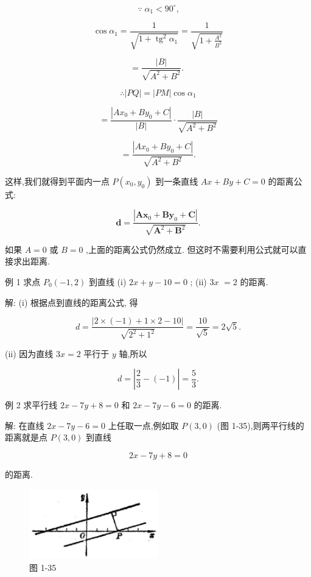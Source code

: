 \documentclass[lang=cn,newtx,10pt,scheme=chinese]{elegantbook}
\begin{document}
\[
  \because \;{\alpha }_{1} < {90}^{ \circ }\text{,}
\]

\[
  \cos {\alpha }_{1} = \frac{1}{\sqrt{1 + {\operatorname{tg}}^{2}{\alpha }_{1}}} = \frac{1}{\sqrt{1 + \frac{{A}^{2}}{{B}^{2}}}}
\]

\[
  = \frac{\left| B\right| }{\sqrt{{A}^{2} + {B}^{2}}}\text{. }
\]

\[
  \therefore \left| {PQ}\right| = \left| {PM}\right| \cos {\alpha }_{1}
\]

\[
  = \frac{\left| A{x}_{0} + B{y}_{0} + C\right| }{\left| B\right| } \cdot \frac{\left| B\right| }{\sqrt{{A}^{2} + {B}^{2}}}
\]

\[
  = \frac{\left| A{x}_{0} + B{y}_{0} + C\right| }{\sqrt{{A}^{2} + {B}^{2}}}.
\]

这样,我们就得到平面内一点 \(P\left( {{x}_{0},{y}_{0}}\right)\) 到一条直线 \({Ax} + {By} + C = 0\) 的距离公式:

\[
  \mathbf{d} = \frac{\left| \mathbf{A}{\mathbf{x}}_{0} + \mathbf{B}{\mathbf{y}}_{0} + \mathbf{C}\right| }{\sqrt{{\mathbf{A}}^{2} + {\mathbf{B}}^{2}}}.
\]

如果 \(A = 0\) 或 \(B = 0\) ,上面的距离公式仍然成立. 但这时不需要利用公式就可以直接求出距离.

例 1 求点 \({P}_{0}\left( {-1,2}\right)\) 到直线 (i) \({2x} + y - {10} = 0\) ; (ii) \({3x}\) \(= 2\) 的距离.

解: (i) 根据点到直线的距离公式, 得

\[
  d = \frac{\left| 2 \times \left( -1\right) + 1 \times 2 - {10}\right| }{\sqrt{{2}^{2} + {1}^{2}}} = \frac{10}{\sqrt{5}} = 2\sqrt{5}.
\]

(ii) 因为直线 \({3x} = 2\) 平行于 \(y\) 轴,所以

\[
  d = \left| {\frac{2}{3} - \left( {-1}\right) }\right| = \frac{5}{3}.
\]

例 2 求平行线 \({2x} - {7y} + 8 = 0\) 和 \({2x} - {7y} - 6 = 0\) 的距离.

解: 在直线 \({2x} - {7y} - 6 = 0\) 上任取一点,例如取 \(P\left( {3,0}\right)\) (图 1-35),则两平行线的距离就是点 \(P\left( {3,0}\right)\) 到直线

\[
    {2x} - {7y} + 8 = 0
\]

的距离.

\begin{figure}[h]
  \centering
  \includegraphics[max width=0.5\textwidth]{images/01912cc2-ffb6-728e-9ae7-b113ff05c64b_56_427717.jpg}
  \caption{图 1-35}
\end{figure}
\end{document}
